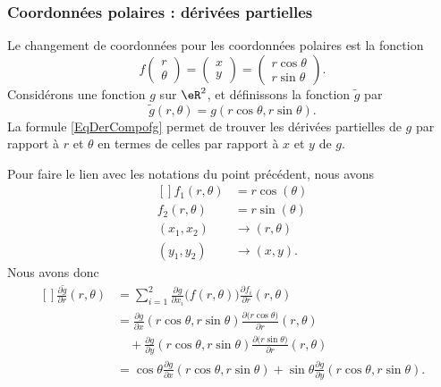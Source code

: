 \subsubsection{Coordonnées polaires : dérivées partielles}

Le changement de coordonnées pour les coordonnées polaires est la fonction
\begin{equation}
	f\begin{pmatrix}
		r \\
		\theta
	\end{pmatrix}=\begin{pmatrix}
		x \\
		y
	\end{pmatrix}=\begin{pmatrix}
		r\cos\theta \\
		r\sin\theta
	\end{pmatrix}.
\end{equation}
Considérons une fonction $g$ sur $\eR^2$, et définissons la fonction $\tilde g$ par
\begin{equation}
	\tilde g(r,\theta)=g(r\cos\theta,r\sin\theta).
\end{equation}
La formule \eqref{EqDerCompofg} permet de trouver les dérivées partielles de $g$ par rapport à $r$ et $\theta$ en termes de celles par rapport à $x$ et $y$ de $g$.

Pour faire le lien avec les notations du point précédent, nous avons
\begin{equation}
	\begin{aligned}[]
		f_1(r,\theta) & =r\cos(\theta) \\
		f_2(r,\theta) & =r\sin(\theta) \\
		(x_1,x_2)     & \to(r,\theta)  \\
		(y_1,y_2)     & \to(x,y).
	\end{aligned}
\end{equation}
Nous avons donc
\begin{equation}
	\begin{aligned}[]
		\frac{ \partial \tilde g }{ \partial r }(r,\theta) & =\sum_{i=1}^2\frac{ \partial g }{ \partial x_i }\big( f(r,\theta) \big)\frac{ \partial f_i }{ \partial r }(r,\theta)                        \\
		                                                   & =\frac{ \partial g }{ \partial x }(r\cos\theta,r\sin\theta)\frac{ \partial \big( r\cos\theta \big) }{ \partial r }(r,\theta)                \\
		                                                   & \quad+\frac{ \partial g }{ \partial y }(r\cos\theta,r\sin\theta)\frac{ \partial \big( r\sin\theta\big) }{ \partial r }(r,\theta)            \\
		                                                   & =\cos\theta\frac{ \partial g }{ \partial x }(r\cos\theta,r\sin\theta)+\sin\theta\frac{ \partial g }{ \partial y }(r\cos\theta,r\sin\theta).
	\end{aligned}
\end{equation}

